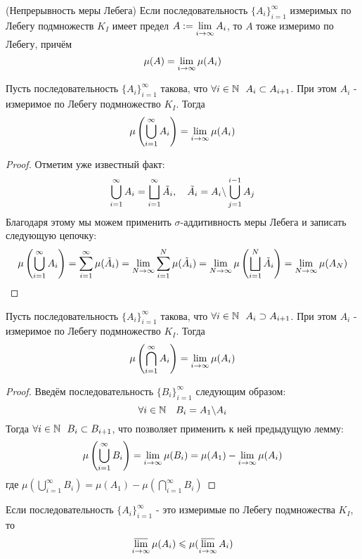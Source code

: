 \begin{theorem} (Непрерывность меры Лебега) \label{4lemth}
	Если последовательность $\{A_i\}_{i = 1}^\infty$ измеримых по Лебегу подмножеств $K_I$ имеет предел $A := \liml_{i \to \infty} A_i$, то $A$ тоже измеримо по Лебегу, причём
	\[
		\mu(A) = \liml_{i \to \infty} \mu(A_i)
	\]
\end{theorem}

\begin{lemma}
	Пусть последовательность $\{A_i\}_{i = 1}^\infty$ такова, что $\forall i \in \N\ \ A_i \subset A_{i + 1}$. При этом $A_i$ - измеримое по Лебегу подмножество $K_I$. Тогда
	\[
		\mu\left(\bigcup_{i = 1}^\infty A_i\right) = \liml_{i \to \infty} \mu(A_i)
	\]
\end{lemma}

\begin{proof}
	Отметим уже известный факт:
	\[
		\bigcup_{i = 1}^\infty A_i = \bscup_{i = 1}^\infty \tilde{A}_i, \quad \tilde{A}_i = A_i \bs \bigcup_{j = 1}^{i - 1} A_j
	\]
	Благодаря этому мы можем применить $\sigma$-аддитивность меры Лебега и записать следующую цепочку:
	\[
		\mu\left(\bigcup_{i = 1}^\infty A_i\right) = \sum_{i = 1}^\infty \mu(\tilde{A}_i) = \liml_{N \to \infty} \sum_{i = 1}^N \mu(\tilde{A}_i) = \liml_{N \to \infty} \mu\left(\bscup_{i = 1}^N \tilde{A}_i\right) = \liml_{N \to \infty} \mu(A_N)
	\]
\end{proof}

\begin{lemma}
	Пусть последовательность $\{A_i\}_{i = 1}^\infty$ такова, что $\forall i \in \N\ \ A_i \supset A_{i + 1}$. При этом $A_i$ - измеримое по Лебегу подмножество $K_I$. Тогда
	\[
		\mu\left(\bigcap_{i = 1}^\infty A_i\right) = \liml_{i \to \infty} \mu(A_i)
	\]
\end{lemma}

\begin{proof}
	Введём последовательность $\{B_i\}_{i = 1}^\infty$ следующим образом:
	\[
		\forall i \in \N \quad B_i = A_1 \bs A_i
	\]
	Тогда $\forall i \in \N\ \ B_i \subset B_{i + 1}$, что позволяет применить к ней предыдущую лемму:
	\[
		\mu\left(\bigcup_{i = 1}^\infty B_i\right) = \liml_{i \to \infty} \mu(B_i) = \mu(A_1) - \liml_{i \to \infty} \mu(A_i)
	\]
	где $\mu\left(\bigcup_{i = 1}^\infty B_i\right) = \mu(A_1) - \mu\left(\bigcap_{i = 1}^\infty B_i\right)$
\end{proof}

\begin{lemma}
	Если последовательность $\{A_i\}_{i = 1}^\infty$ - это измеримые по Лебегу подмножества $K_I$, то
	\[
		\varlimsup_{i \to \infty} \mu(A_i) \le \mu(\varlimsup_{i \to \infty} A_i)
	\]
\end{lemma}

